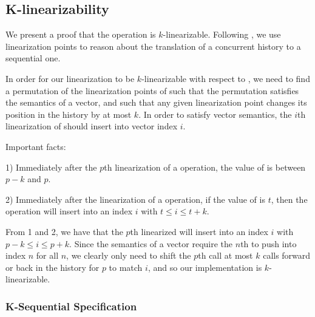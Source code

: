 \documentclass{sigplanconf}
\begin{document}
\subsection{K-linearizability}

We present a proof that the  operation is $k$-linearizable. Following \citet{dechev06}, we use linearization points to reason about the translation of a concurrent history to a sequential one.

In order for our linearization to be $k$-linearizable with respect to , we need to find a permutation of the linearization points of  such that the permutation satisfies the semantics of a vector, and such that any given linearization point changes its position in the history by at most $k$. In order to satisfy vector semantics, the $i$th linearization of  should insert into vector index $i$.

Important facts:

1) Immediately after the $p$th linearization of a  operation, the value of  is between $p-k$ and $p$.

2) Immediately after the linearization of a  operation, if the value of  is $t$, then the operation will insert into an index $i$ with $t \le i \le t + k$.

From 1 and 2, we have that the $p$th linearized  will insert into an index $i$ with $p - k \le i \le p + k$. Since the semantics of a vector require the $n$th  to push into index $n$ for all $n$, we clearly only need to shift the $p$th call at most $k$ calls forward or back in the history for $p$ to match $i$, and so our implementation is $k$-linearizable.

\subsubsection{K-Sequential Specification}
\end{document}

